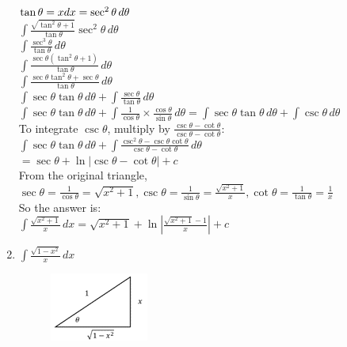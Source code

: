 \documentclass[../main.tex]{subfiles}
\begin{document}
\begin{enumerate}
    \(\tan{\theta}=x\\
    dx=\sec^2{\theta}\,d\theta\)\\

    \(\int \frac{\sqrt{\tan^2{\theta}+1}}{\tan{\theta}}\sec^2{\theta}\,d\theta\)\\

    \(\int \frac{\sec^3{\theta}}{\tan{\theta}}\,d\theta\)\\

    \(\int \frac{\sec{\theta}(\tan^2{\theta}+1)}{\tan{\theta}}\,d\theta\)\\

    \(\int \frac{\sec{\theta}\tan^2{\theta}+\sec{\theta}}{\tan{\theta}}\,d\theta\)\\

    \(\int \sec{\theta}\tan{\theta}\,d\theta+\int \frac{\sec{\theta}}{\tan{\theta}}\,d\theta\)\\

    \(\int \sec{\theta}\tan{\theta}\,d\theta+\int \frac{1}{\cos{\theta}}\times \frac{\cos{\theta}}{\sin{\theta}}\,d\theta=\int \sec{\theta}\tan{\theta}\,d\theta+\int \csc{\theta}\,d\theta\)\\

    To integrate \(\csc{\theta}\), multiply by \(\frac{\csc{\theta}-\cot{\theta}}{\csc{\theta}-\cot{\theta}}\):\\

    \(\int \sec{\theta}\tan{\theta}\,d\theta+\int \frac{\csc^2{\theta}-\csc{\theta}\cot{\theta}}{\csc{\theta}-\cot{\theta}}\,d\theta\)\\

    \(=\sec{\theta}+\ln{|\csc{\theta}-\cot{\theta}|}+c\)\\

    From the original triangle,\\
    \(\sec{\theta}=\frac{1}{\cos{\theta}}=\sqrt{x^2+1}, \csc{\theta}=\frac{1}{\sin{\theta}}=\frac{\sqrt{x^2+1}}{x}, \cot{\theta}=\frac{1}{\tan{\theta}}=\frac{1}{x}\)\\

    So the answer is:\\
    \(\int \frac{\sqrt{x^2+1}}{x}\,dx=\sqrt{x^2+1}+\ln{|\frac{\sqrt{x^2+1}-1}{x}|}+c\)\\

    \item 
    \(\int \frac{\sqrt{1-x^2}}{x}\,dx\)\\
    \begin{figure}[h]
        \includegraphics{images/trigsuba9.png}
    \end{figure}


\end{enumerate}
\end{document}

